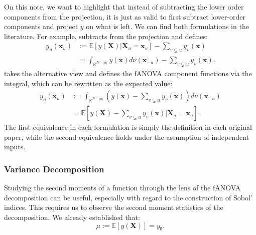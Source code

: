 On this note, we want to highlight that instead of subtracting the lower order components from the projection, it is just as valid to first subtract lower-order components and project $y$ on what is left.
We can find both formulations in the literature.
For example, \cite{muehlenstaedt2012} subtracts from the projection and defines:
\begin{align*}
    y_u(\boldsymbol{x}_u) &:=
    \mathbb{E}[y(\boldsymbol{X}) | \boldsymbol{X}_{u} = \boldsymbol{x}_u] - \sum_{v \subsetneq u} y_v(\boldsymbol{x}) \\
    &= \int_{\mathbb{R}^{N-|u|}} y(\boldsymbol{x}) d \nu(\boldsymbol{x}_{-u}) - \sum_{v \subsetneq u} y_v(\boldsymbol{x}).
\end{align*}
\cite{hooker2004} takes the alternative view and defines the fANOVA component functions via the integral, which can be rewritten as the expected value:
\begin{align*}
    y_u(\boldsymbol{x}_u)
    &:= \int_{\mathbb{R}^{N-|u|}} (y(\boldsymbol{x}) - \sum_{v \subsetneq u} y_v(\boldsymbol{x})) d \nu(\boldsymbol{x}_{-u}) \\
    &= \mathbb{E}[y(\boldsymbol{X}) - \sum_{v \subsetneq u} y_v(\boldsymbol{x}) | \boldsymbol{X}_{u} = \boldsymbol{x}_u ].
\end{align*}
The first equivalence in each formulation is simply the definition in each original paper, while the second equivalence holds under the assumption of independent inputs.


\subsubsection{Variance Decomposition}
Studying the second moments of  a function through the lens of the fANOVA decomposition can be useful, especially with regard to the construction of Sobol' indices. This requires us to observe the second moment statistics of the decomposition. We already established that:
$$ \mu := \mathbb{E}[y(\boldsymbol{X})] = y_{\emptyset}.$$

